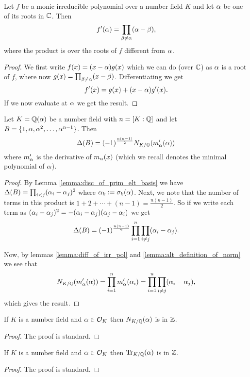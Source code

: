 \begin{lemma}\label{lemma:diff_of_irr_pol}
	\leanok
	Let $f$ be a monic irreducible polynomial over a number field $K$ and let $\alpha$ be one of its roots in $\mathbb{C}$. Then \[f'(\alpha)=\prod_{\beta \neq \alpha} (\alpha-\beta),  \] where the product is over the roots of $f$ different from $\alpha$.
\end{lemma}
\begin{proof}
	\leanok
	We first write $f(x)=(x-\alpha)g(x)$ which we can do (over $\mathbb{C}$) as $\alpha$ is a root of $f$, where now $g(x)=\prod_{\beta \neq \alpha} (x-\beta)$. Differentiating we get \[f'(x)=g(x)+(x-\alpha)g'(x).\] If we now evaluate at $\alpha$ we get the result.
\end{proof}

\begin{lemma}\label{lemma:num_field_disc_in_terms_of_norm}
	\leanok
	Let $K=\mathbb{Q}(\alpha)$ be a number field with $n=[K:\mathbb{Q}]$ and let $B=\{1,\alpha,\alpha^2,\dots,\alpha^{n-1}\}$. Then \[\Delta(B)=(-1)^{\frac{n(n-1)}{2}}N_{K/\mathbb{Q}}(m_\alpha'(\alpha))\] where $m_\alpha'$ is the derivative of $m_\alpha(x)$ (which we recall denotes the minimal polynomial of $\alpha$).
\end{lemma}
\begin{proof}
	\leanok
	By Lemma \ref{lemma:disc_of_prim_elt_basis} we have $\Delta(B)=\prod_{i < j}(\alpha_i-\alpha_j)^2$ where $\alpha_k:=\sigma_k(\alpha)$. Next, we note that the number of terms in this product is $1+2+\cdots+(n-1)=\frac{n(n-1)}{2}$. So if we write each term as $(\alpha_i-\alpha_j)^2=-(\alpha_i-\alpha_j)(\alpha_j-\alpha_i)$ we get \[\Delta(B)=(-1)^{\frac{n(n-1)}{2}}\prod_{i=1}^n \prod_{i \neq j} (\alpha_i-\alpha_j). \]

	Now, by lemmas \ref{lemma:diff_of_irr_pol} and \ref{lemma:alt_definition_of_norm} we see that \[N_{K/\mathbb{Q}}(m_\alpha'(\alpha))=\prod_{i=1}^n m_\alpha'(\alpha_i)=\prod_{i=1}^n \prod_{i \neq j} (\alpha_i-\alpha_j),\] which gives the result.
\end{proof}

\begin{lemma}\label{lemma:norm_of_alg_int_is_int}
	\leanok
	If $K$ is a number field and $\alpha \in \mathcal{O}_K$ then $N_{K/\mathbb{Q}}(\alpha)$ is in $\mathbb{Z}$.
\end{lemma}
\begin{proof}
	\leanok
	The proof is standard.
\end{proof}

\begin{lemma}\label{lemma:trace_of_alg_int_is_int}
	\leanok
	If $K$ is a number field and $\alpha \in \mathcal{O}_K$ then $\operatorname{Tr}_{K/\mathbb{Q}}(\alpha)$ is in $\mathbb{Z}$.
\end{lemma}
\begin{proof}
	\leanok
	The proof is standard.
\end{proof}

